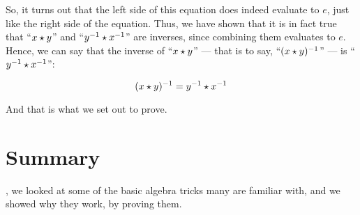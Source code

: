 \documentclass[../../../main.tex]{subfiles}
\begin{document}
So, it turns out that the left side of this equation does indeed evaluate to $e$, just like the right side of the equation. Thus, we have shown that it is in fact true that ``$\op{x}{y}$'' and ``$\op{\inverseEl{y}}{\inverseEl{x}}$'' are inverses, since combining them evaluates to $e$. Hence, we can say that the inverse of ``$\op{x}{y}$'' --- that is to say, ``$\inverseEl{(\op{x}{y})}$'' --- is ``$\op{\inverseEl{y}}{\inverseEl{x}}$'':

\begin{equation*}
  \inverseEl{(\op{x}{y})} = \op{\inverseEl{y}}{\inverseEl{x}}
\end{equation*}

And that is what we set out to prove.


\section{Summary}

, we looked at some of the basic algebra tricks many are familiar with, and we showed why they work, by proving them.
\end{document}
